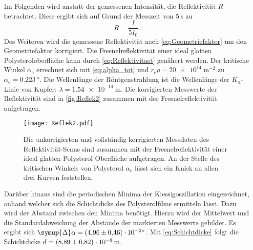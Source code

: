 Im Folgenden wird anstatt der gemessenen Intensität, die Reflektivität $R$ betrachtet. Diese ergibt sich auf Grund der Messzeit von $\qty{5}{\second}$ zu 
\begin{equation*}
  R = \frac{I}{5I_0}.
\end{equation*}
Des Weiteren wird die gemessene Reflektivität nach \autoref{eq:Geometriefaktor} um den Geometriefaktor korrigiert.
Die Fresnelreflektivität einer ideal glatten Polysteroloberfläche kann durch \autoref{eq:Reflektivitaet} genähert werden. Der kritische Winkel $\alpha_\text{c}$ errechnet sich mit
\autoref{eq:alpha_tot} und $r_e\rho = \qty{20e14}{\metre^{-2}}$ \cite{V44} zu $\alpha_\text{c} = \qty{0.223}{\degree}$. Die Wellenlänge der Röntgenstrahlung ist die 
Wellenlänge der $K_\alpha$-Linie von Kupfer: $\lambda = \qty{1.54e-10}{\metre}$.
Die korrigierten Messwerte der Reflektivität sind in \autoref{fig:Reflek2} zusammen mit der Fresnelreflektivität aufgetragen.
\begin{figure}
  \centering
  \texttt{[image: Reflek2.pdf]}
  \caption{Die unkorrigierten und vollständig korrigierten Messdaten des Reflektivität-Scans sind zusammen mit der Fresnelreflektivität einer 
  ideal glatten Polysterol Oberfläche aufgetragen. An der Stelle des kritischen Winkels von Polysterol $\alpha_\text{c}$ lässt sich ein Knick an allen drei Kurven feststellen.}
  \label{fig:Reflek2}
\end{figure}
Darüber hinaus sind die periodischen Minima der Kiessigoszillation eingezeichnet, anhand welcher sich die Schichtdicke des Polysterolfilms ermitteln lässt.
Dazu wird der Abstand zwischen den Minima benötigt. Hierzu wird der Mittelwert und die Standardabweichung der Abstände der markierten Messwerte gebildet. Es ergibt sich 
$\symup{\Delta}\alpha = \qty{4.96 +- 0.46e-2}{\degree}$. Mit \autoref{eq:Schichtdicke} folgt die Schichtdicke $d = \qty{8.89 +- 0.82e-8}{\metre}$.

